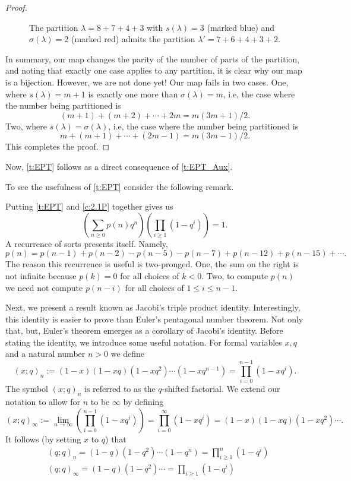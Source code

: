 \begin{proof}
\begin{figure}[H]
    \caption{The partition $\lambda=8+7+4+3$ with $s(\lambda)=3$ (marked blue) and $\sigma(\lambda)=2$ (marked red) admits the partition $\lambda'=7+6+4+3+2$.}
\end{figure}
In summary, our map changes the parity of the number of parts of the partition, and noting that exactly one case applies to any partition, it is clear why our map is a bijection. However, we are not done yet! Our map fails in two cases. One, where $s(\lambda)=m+1$ is exactly one more than $\sigma(\lambda)=m$, i.e, the case where the number being partitioned is \[
(m+1)+(m+2)+\cdots+2m = m(3m+1)/2.
\]
Two, where $s(\lambda)=\sigma(\lambda)$, i.e, the case where the number being partitioned is \[
m+(m+1)+\cdots+(2m-1) = m(3m-1)/2.
\]
This completes the proof. 
\end{proof}
Now, \cref{t:EPT} follows as a direct consequence of \cref{t:EPT_Aux}. 
\par
To see the usefulness of \cref{t:EPT} consider the following remark.
\begin{remark}
Putting \cref{t:EPT} and \cref{c:2.1P} together gives us \[
\left(\sum_{n\geq 0}p(n)q^n\right)\left(\prod_{i\geq 1}(1-q^i)\right) = 1.
\] A recurrence of sorts presents itself. Namely,
\[
p(n) = p(n-1)+p(n-2)-p(n-5)-p(n-7)+p(n-12)+p(n-15)+\cdots. 
\] The reason this recurrence is useful is two-pronged. One, the sum on the right is not infinite because $p(k)=0$ for all choices of $k<0$. Two, to compute $p(n)$ we need not compute $p(n-i)$ for all choices of $1\leq i\leq n-1$.
\end{remark}
Next, we present a result known as Jacobi's triple product identity. Interestingly, this identity is easier to prove than Euler's pentagonal number theorem. Not only that, but, Euler's theorem emerges as a corollary of Jacobi's identity. Before stating the identity, we introduce some useful notation. For formal variables $x,q$ and a natural number $n>0$ we define
\[
(x;q)_n := (1-x)(1-xq)(1-xq^2)\cdots(1-xq^{n-1}) = \prod_{i=0}^{n-1}(1-xq^i).
\]
The symbol $(x;q)_n$ is referred to as the $q$-shifted factorial. We extend our notation to allow for $n$ to be $\infty$ by defining
\[
(x;q)_\infty := \lim_{n\to \infty}\left(\prod_{i=0}^{n-1}(1-xq^i)\right) = \prod_{i=0}^{\infty}(1-xq^i) = (1-x)(1-xq)(1-xq^2)\cdots.
\]
It follows (by setting $x$ to $q$) that
\begin{align*}
    &(q;q)_n = (1-q)(1-q^2)\cdots(1-q^n) = \prod_{i\geq 1}^n (1-q^i)\\
    &(q;q)_\infty = (1-q)(1-q^2)\cdots = \prod_{i\geq 1}(1-q^i)
\end{align*}
